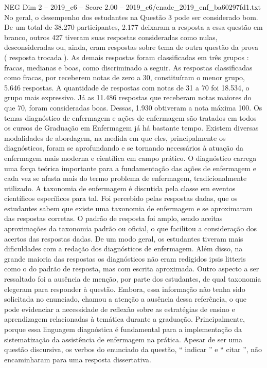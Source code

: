 \begin{textsample}{NEG Dim 2 – 2019\_c6 – Score 2.00 – 2019\_c6/enade\_2019\_enf\_ba60297fd1.txt}
No geral, o desempenho dos estudantes na Questão 3 pode ser considerado bom.
De um total de 38.270 participantes, 2.177 deixaram a resposta a essa questão em branco, outros 427 tiveram suas respostas consideradas como nulas, desconsideradas ou, ainda, eram respostas sobre tema de outra questão da prova ( resposta trocada ).
As demais respostas foram classificadas em três grupos : fracas, medianas e boas, como discriminado a seguir.
As respostas classificadas como fracas, por receberem notas de zero a 30, constituíram o menor grupo, 5.646 respostas.
A quantidade de respostas com notas de 31 a 70 foi 18.534, o grupo mais expressivo.
Já as 11.486 respostas que receberam notas maiores do que 70, foram consideradas boas.
Dessas, 1.930 obtiveram a nota máxima 100.
Os temas diagnóstico de enfermagem e ações de enfermagem são tratados em todos os cursos de Graduação em Enfermagem já há bastante tempo.
Existem diversas modalidades de abordagem, na medida em que eles, principalmente os diagnósticos, foram se aprofundando e se tornando necessários à atuação da enfermagem mais moderna e científica em campo prático.
O diagnóstico carrega uma força teórica importante para a fundamentação das ações de enfermagem e cada vez se afasta mais do termo problema de enfermagem, tradicionalmente utilizado.
A taxonomia de enfermagem é discutida pela classe em eventos científicos específicos para tal.
Foi percebido pelas respostas dadas, que os estudantes sabem que existe uma taxonomia de enfermagem e se aproximaram das respostas corretas.
O padrão de resposta foi amplo, sendo aceitas aproximações da taxonomia padrão ou oficial, o que facilitou a consideração dos acertos das respostas dadas.
De um modo geral, os estudantes tiveram mais dificuldades com a redação dos diagnósticos de enfermagem.
Além disso, na grande maioria das respostas os diagnósticos não eram redigidos ipsis litteris como o do padrão de resposta, mas com escrita aproximada.
Outro aspecto a ser ressaltado foi a ausência de menção, por parte dos estudantes, de qual taxonomia elegeram para responder à questão.
Embora, essa informação não tenha sido solicitada no enunciado, chamou a atenção a ausência dessa referência, o que pode evidenciar a necessidade de reflexão sobre as estratégias de ensino e aprendizagem relacionadas à temática durante a graduação.
Principalmente, porque essa linguagem diagnóstica é fundamental para a implementação da sistematização da assistência de enfermagem na prática.
Apesar de ser uma questão discursiva, os verbos do enunciado da questão, “ indicar ” e “ citar ”, não encaminharam para uma resposta dissertativa.

\end{textsample}
